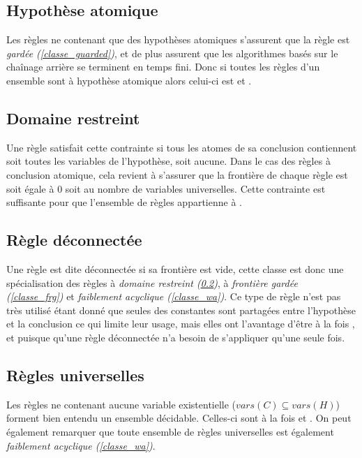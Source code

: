 \subsection{Hypothèse atomique}\label{classe_ah}
Les règles ne contenant que des hypothèses atomiques s'assurent que la règle est {\em
gardée (\ref{classe_guarded})}, et de plus assurent que les algorithmes basés sur le 
chaînage arrière se terminent en temps fini.
Donc si toutes les règles d'un ensemble sont à hypothèse atomique alors celui-ci est \gbts et
\fus.

\subsection{Domaine restreint}\label{classe_dr}
Une règle satisfait cette contrainte si tous les atomes de sa conclusion
contiennent soit toutes les variables de l'hypothèse, soit aucune.
Dans le cas des règles à conclusion atomique, cela revient à s'assurer que la frontière
de chaque règle est soit égale à 0 soit au nombre de variables universelles.
Cette contrainte est suffisante pour que l'ensemble de règles appartienne à \fus.


\subsection{Règle déconnectée}\label{classe_disc}
Une règle est dite déconnectée si sa frontière est vide, cette classe est donc une
spécialisation des règles à {\em domaine restreint (\ref{classe_dr})}, à {\em frontière
gardée (\ref{classe_frg})} et {\em faiblement acyclique (\ref{classe_wa})}.
Ce type de règle n'est pas très utilisé étant donné que seules des constantes sont
partagées entre l'hypothèse et la conclusion ce qui limite leur usage, mais elles ont
l'avantage d'être à la fois \fes, \gbts et \fus puisque qu'une règle déconnectée n'a
besoin de s'appliquer qu'une seule fois.

\subsection{Règles universelles}\label{classe_rr}
Les règles ne contenant aucune variable existentielle ($vars(C) \subseteq vars(H)$) forment bien entendu
un ensemble décidable. Celles-ci sont à la fois \fes et \gbts. On peut également
remarquer que toute ensemble de règles universelles est également {\em faiblement
acyclique (\ref{classe_wa})}.

